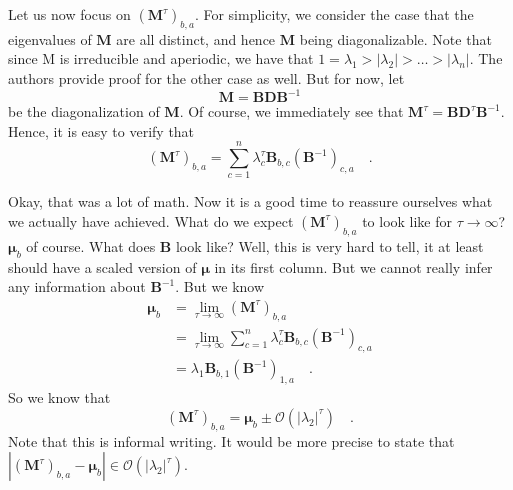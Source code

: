 \documentclass[../../main.tex]{subfiles}
\begin{document}
    Let us now focus on $(\boldsymbol{M}^{\tau})_{b,a}$. For simplicity, we consider the case that the eigenvalues of $\boldsymbol{M}$ are all distinct, and hence $\boldsymbol{M}$ being diagonalizable. Note that since M is irreducible and aperiodic, we have that $1 = \lambda_1 > |\lambda_2| > \dots > |\lambda_n|$. The authors provide proof for the other case as well. But for now, let
    \[
        \boldsymbol{M} = \boldsymbol{BDB}^{-1}
    \]
    be the diagonalization of $\boldsymbol{M}$. Of course, we immediately see that $\boldsymbol{M}^\tau = \boldsymbol{BD}^\tau \boldsymbol{B}^{-1}$. Hence, it is easy to verify that
    \[
        (\boldsymbol{M}^\tau)_{b,a} = \sum_{c = 1}^{n} \lambda_c^\tau \boldsymbol{B}_{b,c}(\boldsymbol{B}^{-1})_{c,a} \quad .
    \]

    \bigskip \noindent
    Okay, that was a lot of math. Now it is a good time to reassure ourselves what we actually have achieved. What do we expect $(\boldsymbol{M}^\tau)_{b,a}$ to look like for $\tau \rightarrow \infty$? $\boldsymbol{\mu}_b$ of course. What does $\boldsymbol{B}$ look like? Well, this is very hard to tell, it at least should have a scaled version of $\boldsymbol{\mu}$ in its first column. But we cannot really infer any information about $\boldsymbol{B}^{-1}$. But we know
    \begin{align*}
        \boldsymbol{\mu}_b &= \lim_{\tau \to \infty} (\boldsymbol{M}^\tau)_{b,a} \\
        &= \lim_{\tau \to \infty} \sum_{c = 1}^{n} \lambda_c^\tau \boldsymbol{B}_{b,c}(\boldsymbol{B}^{-1})_{c,a} \\
        &= \lambda_1 \boldsymbol{B}_{b,1}(\boldsymbol{B}^{-1})_{1,a} \quad .
    \end{align*}
    So we know that
    \[
        (\boldsymbol{M}^\tau)_{b,a} = \boldsymbol{\mu}_b \pm \mathcal{O}(|\lambda_2|^\tau) \quad .
    \]
    Note that this is informal writing. It would be more precise to state that $|(\boldsymbol{M}^\tau)_{b,a} - \boldsymbol{\mu}_b| \in \mathcal{O}(|\lambda_2|^\tau)$.
\end{document}
